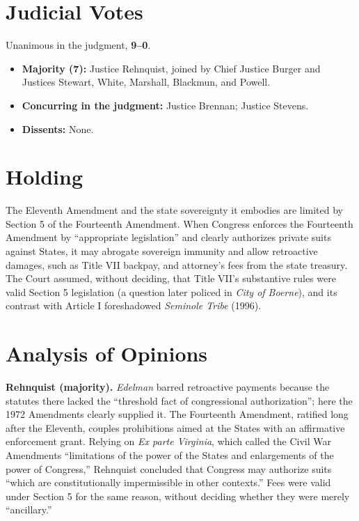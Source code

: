 \documentclass[12pt]{article}
\begin{document}
\section{Judicial Votes}

Unanimous in the judgment, \textbf{9--0}.
\begin{itemize}
\item \textbf{Majority (7):} Justice Rehnquist, joined by Chief Justice Burger and Justices Stewart, White, Marshall, Blackmun, and Powell.
\item \textbf{Concurring in the judgment:} Justice Brennan; Justice Stevens.
\item \textbf{Dissents:} None.
\end{itemize}

\section{Holding}

The Eleventh Amendment and the state sovereignty it embodies are limited by Section 5 of the Fourteenth Amendment. When Congress enforces the Fourteenth Amendment by ``appropriate legislation'' and clearly authorizes private suits against States, it may abrogate sovereign immunity and allow retroactive damages, such as Title VII backpay, and attorney's fees from the state treasury. The Court assumed, without deciding, that Title VII's substantive rules were valid Section 5 legislation (a question later policed in \textit{City of Boerne}), and its contrast with Article I foreshadowed \textit{Seminole Tribe} (1996).

\section{Analysis of Opinions}

\textbf{Rehnquist (majority).} \textit{Edelman} barred retroactive payments because the statutes there lacked the ``threshold fact of congressional authorization''; here the 1972 Amendments clearly supplied it. The Fourteenth Amendment, ratified long after the Eleventh, couples prohibitions aimed at the States with an affirmative enforcement grant. Relying on \textit{Ex parte Virginia}, which called the Civil War Amendments ``limitations of the power of the States and enlargements of the power of Congress,'' Rehnquist concluded that Congress may authorize suits ``which are constitutionally impermissible in other contexts.'' Fees were valid under Section 5 for the same reason, without deciding whether they were merely ``ancillary.''
\end{document}
